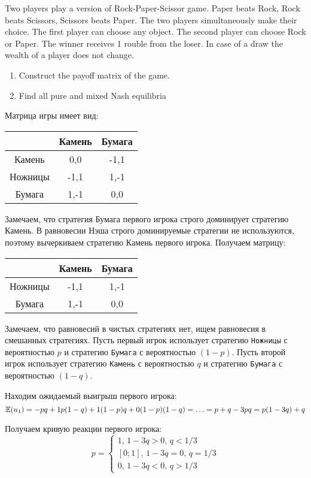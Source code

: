 \begin{problem}
Two players play a version of Rock-Paper-Scissor game. Paper beats Rock, Rock beats Scissors, Scissors beats Paper. The two players simultaneously make their choice. The first player can choose any object. The second player can choose Rock or Paper. The winner receives 1 rouble from the loser. In case of a draw the wealth of a player does not change.
\begin{enumerate}
\item Construct the payoff matrix of the game.
\item Find all pure and mixed Nash equilibria
\end{enumerate}


\begin{sol}
Матрица игры имеет вид:

\begin{tabular}{c|cc}
 & Камень & Бумага \\
\hline
Камень & 0,0 & -1,1 \\
Ножницы & -1,1 & 1,-1 \\
Бумага & 1,-1 & 0,0 \\
\end{tabular}

Замечаем, что стратегия Бумага первого игрока строго доминирует стратегию Камень. В равновесии Нэша строго доминируемые стратегии не используются, поэтому вычеркиваем стратегию Камень первого игрока. Получаем матрицу:

\begin{tabular}{c|cc}
 & Камень & Бумага \\
\hline
Ножницы & -1,1 & 1,-1 \\
Бумага & 1,-1 & 0,0 \\
\end{tabular}

Замечаем, что равновесий в чистых стратегиях нет, ищем равновесия в смешанных стратегиях. Пусть первый игрок использует стратегию \verb|Ножницы| с вероятностью $p$ и стратегию \verb|Бумага| с вероятностью $(1-p)$. Пусть второй игрок использует стратегию \verb|Камень| с вероятностью $q$ и стратегию \verb|Бумага| с вероятностью $(1-q)$.

Находим ожидаемый выигрыш первого игрока:
\[
\mathbb{E}(u_1)=-pq+1p(1-q)+1(1-p)q+0(1-p)(1-q)=\ldots=p+q-3pq=p(1-3q)+q
\]

Получаем кривую реакции первого игрока:
\[
p=
\begin{cases}
1, \, 1-3q>0, \, q<1/3 \\
[0;1], \, 1-3q=0, \, q=1/3 \\
0, \, 1-3q<0, \, q>1/3
\end{cases}
\]



\end{sol}
\end{problem}
